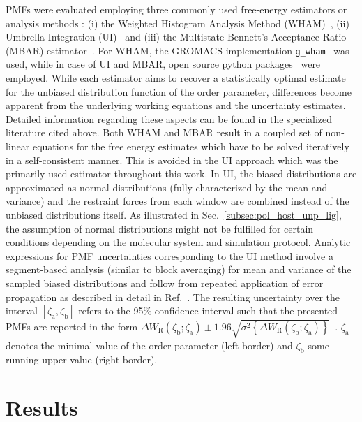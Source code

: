 \documentclass[9pt,lessons]{livecoms}
\begin{document}
PMFs were evaluated employing three commonly used free-energy estimators or analysis methods : 
(i) the Weighted Histogram Analysis Method (WHAM)~\cite{ferrenberg1989ferrenberg, kumar1992weighted, roux1995calculation}, 
(ii) Umbrella Integration (UI)~\cite{billeter2000computer, kastner2005bridging, kastner2006analysis} and 
(iii) the Multistate Bennett's Acceptance Ratio (MBAR) estimator~\cite{shirts2008statistically}.
For WHAM, the GROMACS implementation \texttt{g\_wham}~\cite{hub2010g_wham} was used, while in case of UI and MBAR, open source python packages~\cite{umbrellaintgit, pymbargit} were employed.
While each estimator aims to recover a statistically optimal estimate for the unbiased distribution function of the order parameter, differences become apparent from the underlying working equations and the uncertainty estimates.
Detailed information regarding these aspects can be found in the specialized literature cited above.
Both WHAM and MBAR result in a coupled set of non-linear equations for the free energy estimates which have to be solved iteratively in a self-consistent manner.
This is avoided in the UI approach which was the primarily used estimator throughout this work. 
In UI, the biased distributions are approximated as normal distributions (fully characterized by the mean and variance) 
and the restraint forces from each window are combined instead of the unbiased distributions itself.
As illustrated in Sec.~\ref{subsec:pol_host_unp_lig}, the assumption of normal distributions might not be fulfilled for certain conditions depending on the molecular system and simulation protocol.
Analytic expressions for PMF uncertainties corresponding to the UI method involve a segment-based analysis (similar to block averaging) for mean and variance of the sampled biased distributions and  
follow from repeated application of error propagation as described in detail in Ref.~.
The resulting uncertainty over the interval $\left[\zeta_\mathrm{a}, \zeta_\mathrm{b} \right]$ refers to the 95$\%$ confidence interval such that the presented PMFs are reported in the form 
$\Delta W_\mathrm{R}(\zeta_\mathrm{b};  \zeta_\mathrm{a}) \pm 1.96 \sqrt{\sigma^2 \left \{ \Delta W_\mathrm{R}(\zeta_\mathrm{b};  \zeta_\mathrm{a}) \right \}}$~\cite{kastner2006analysis}.
$\zeta_\mathrm{a}$ denotes the minimal value of the order parameter (left border) and $\zeta_\mathrm{b}$ some running upper value (right border).

\section{Results}
\end{document}
